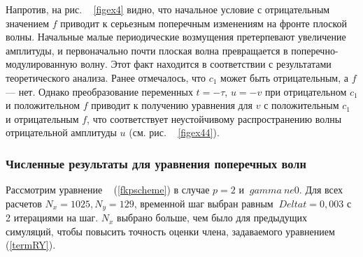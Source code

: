 Напротив, на рис. ~ \ref{figex4} видно, что начальное условие с отрицательным значением $ f $ приводит к серьезным поперечным изменениям на фронте плоской волны. Начальные малые периодические возмущения претерпевают увеличение амплитуды, и первоначально почти плоская волна превращается в поперечно-модулированную волну. Этот факт находится в соответствии с результатами теоретического анализа. Ранее отмечалось, что $ c_1 $ может быть отрицательным, а $ f $ --- нет. Однако преобразование переменных $ t = - \tau $, $ u = -v $ при отрицательном $ c_1 $ и положительном $ f $ приводит к получению уравнения для $ v $ с положительным $ c_1 $ и отрицательным $ f $, что соответствует неустойчивому распространению волны отрицательной амплитуды $ u $ (см. рис. ~ \ref{figex44}).

\subsubsection{Численные результаты для уравнения поперечных волн}

Рассмотрим уравнение ~ (\ref{fkpscheme}) в случае $ p = 2 $ и $ \ gamma \ ne 0 $.
Для всех расчетов $ N_x = 1025, N_y = 129 $, временной шаг выбран равным $ \ Delta t = 0,003 $ с 2 итерациями на шаг. $ N_x $ выбрано больше, чем было для предыдущих симуляций, чтобы повысить точность оценки члена, задаваемого уравнением ~ (\ref{termRY}).

